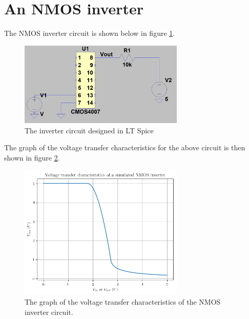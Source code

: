 \documentclass[titlepage, 12pt]{article}
\begin{document}
    \section{An NMOS inverter}
    The NMOS inverter circuit is shown below in figure
    \ref{fig:inverter_circuit}.
    \begin{figure}[H]
        \centering
        \includegraphics[width=0.7\textwidth]{figures/inverter_circuit.png}
        \caption{The inverter circuit designed in LT Spice}
        \label{fig:inverter_circuit}
    \end{figure}
    The graph of the voltage transfer characteristics for the above
    circuit is then shown in figure \ref{fig:invert_graph}.
    \begin{figure}[H]
        \centering
        \includegraphics[width=0.7\textwidth]{figures/part_2_invert.png}
        \caption{The graph of the voltage transfer characteristics of
        the NMOS inverter circuit.}
        \label{fig:invert_graph}
    \end{figure}
\end{document}
